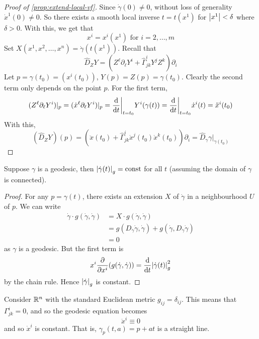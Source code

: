 \documentclass{article}
\begin{document}
\begin{proof}
    [Proof of \cref{prop:extend-local-vf}]
    Since \(\dot\gamma(0) \ne 0\), without loss of generality \(\dot x^1(0) \ne 0\). So there exists a smooth local inverse \(t = t(x^1)\) for \(\abs{x^1} < \delta\) where \(\delta > 0\). With this, we get that
    \[x^i = x^i(x^1) \text{ for }i = 2, \dots, m\]
    Set \(X(x^1, x^2, \dots, x^n) = \dot\gamma(t(x^1))\). Recall that
    \[\widehat D_ZY = \left(Z^\ell \partial_\ell Y^i + \widehat\Gamma^i_{jk}Y^jZ^k\right)\partial_i\]
    Let \(p = \gamma(t_0) = (x^i(t_0))\), \(Y(p) = Z(p) = \gamma(t_0)\).  Clearly the second term only depends on the point \(p\). For the first term,
    \[(Z^\ell\partial_\ell Y^i)\vert_p = (\dot x^\ell \partial_\ell Y^i)\vert_p = \dv{t}\bigg\vert_{t = t_0}Y^i(\gamma(t)) = \dv{t}\bigg\vert_{t = t_0}\dot x^i(t) = \ddot x^i(t_0)\]
    With this,
    \[(\widehat D_ZY)(p) = (\ddot x(t_0) + \widehat \Gamma^i_{jk}\dot x^j(t_0) \dot x^k(t_0))\partial_i = \widehat D_\gamma\gamma\vert_{\gamma(t_0)}\]
\end{proof}

\begin{proposition}
    Suppose \(\gamma\) is a geodesic, then \(\abs{\dot\gamma(t)}_g = \text{const}\) for all \(t\) (assuming the domain of \(\gamma\) is connected).
\end{proposition}

\begin{proof}
    For any \(p = \gamma(t)\), there exists an extension \(X\) of \(\dot\gamma\) in a neighbourhood \(U\) of \(p\). We can write
    \begin{align*}
        \dot\gamma \cdot g(\dot\gamma, \dot \gamma) &= X \cdot g(\dot\gamma, \dot \gamma) \\
        &= g(D_{\dot\gamma}\dot\gamma, \dot\gamma) + g(\dot\gamma, D_{\dot\gamma}\dot\gamma) \\
        &= 0
    \end{align*}
    as \(\gamma\) is a geodesic. But the first term is
    \[x^i\pdv{x^i}(g(\dot\gamma, \dot\gamma)) = \dv{t}\abs{\dot\gamma(t)}_g^2\]
    by the chain rule. Hence \(\abs{\dot\gamma}_g\) is constant.
\end{proof}

\begin{example}
    Consider \(\mathbb{R}^n\) with the standard Euclidean metric \(g_{ij} = \delta_{ij}\). This means that \(\Gamma^i_{jk} = 0\), and so the geodesic equation becomes
    \[\ddot x^i \equiv 0\]
    and so \(\dot x^i\) is constant. That is, \(\gamma_p(t, a) = p + at\) is a straight line.
\end{example}
\end{document}
